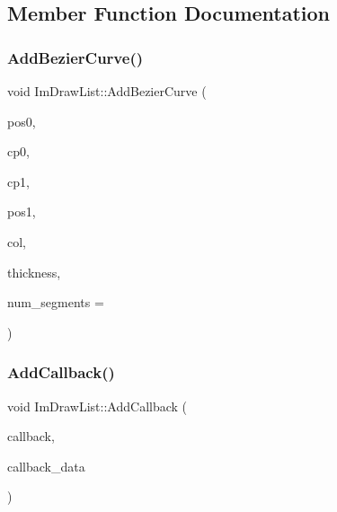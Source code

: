 \subsection{Member Function Documentation}
\mbox{\label{struct_im_draw_list_afd2eeeb8ed23b6222513953b03620101}} 
\subsubsection{\texorpdfstring{Add\+Bezier\+Curve()}{AddBezierCurve()}}
{\footnotesize\ttfamily void Im\+Draw\+List\+::\+Add\+Bezier\+Curve (\begin{DoxyParamCaption}\item[{const \mbox{\hyperlink{struct_im_vec2}{Im\+Vec2}} \&}]{pos0,  }\item[{const \mbox{\hyperlink{struct_im_vec2}{Im\+Vec2}} \&}]{cp0,  }\item[{const \mbox{\hyperlink{struct_im_vec2}{Im\+Vec2}} \&}]{cp1,  }\item[{const \mbox{\hyperlink{struct_im_vec2}{Im\+Vec2}} \&}]{pos1,  }\item[{\mbox{\hyperlink{imgui_8h_a118cff4eeb8d00e7d07ce3d6460eed36}{Im\+U32}}}]{col,  }\item[{float}]{thickness,  }\item[{int}]{num\+\_\+segments = {} }\end{DoxyParamCaption})}

\mbox{\label{struct_im_draw_list_a14073d60ef9db9dc663dc7717a4893a5}} 
\subsubsection{\texorpdfstring{Add\+Callback()}{AddCallback()}}
{\footnotesize\ttfamily void Im\+Draw\+List\+::\+Add\+Callback (\begin{DoxyParamCaption}\item[{\mbox{\hyperlink{imgui_8h_a232a477233f9e3ab7640720bf94674de}{Im\+Draw\+Callback}}}]{callback,  }\item[{void $\ast$}]{callback\+\_\+data }\end{DoxyParamCaption})}

